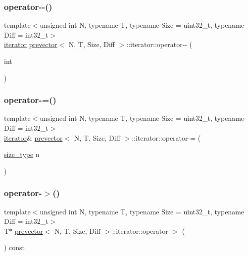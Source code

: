 \subsubsection{\texorpdfstring{operator-\/-\/()}{operator--()}\hspace{0.1cm}{\footnotesize\ttfamily [2/2]}}
{\footnotesize\ttfamily template$<$unsigned int N, typename T, typename Size = uint32\+\_\+t, typename Diff = int32\+\_\+t$>$ \\
\mbox{\hyperlink{classprevector_1_1iterator}{iterator}} \mbox{\hyperlink{classprevector}{prevector}}$<$ N, T, Size, Diff $>$\+::iterator\+::operator-\/-\/ (\begin{DoxyParamCaption}\item[{int}]{ }\end{DoxyParamCaption})\hspace{0.3cm}{\ttfamily [inline]}}

\mbox{\label{classprevector_1_1iterator_a979c36f0f892be45415f70ca65f325b4}} 
\subsubsection{\texorpdfstring{operator-\/=()}{operator-=()}}
{\footnotesize\ttfamily template$<$unsigned int N, typename T, typename Size = uint32\+\_\+t, typename Diff = int32\+\_\+t$>$ \\
\mbox{\hyperlink{classprevector_1_1iterator}{iterator}}\& \mbox{\hyperlink{classprevector}{prevector}}$<$ N, T, Size, Diff $>$\+::iterator\+::operator-\/= (\begin{DoxyParamCaption}\item[{\mbox{\hyperlink{classprevector_a7e0da95e6d1c878f6eeb572f4fc12524}{size\+\_\+type}}}]{n }\end{DoxyParamCaption})\hspace{0.3cm}{\ttfamily [inline]}}

\mbox{\label{classprevector_1_1iterator_a2d71176663fdf1736d59419d8016b652}} 
\subsubsection{\texorpdfstring{operator-\/$>$()}{operator->()}}
{\footnotesize\ttfamily template$<$unsigned int N, typename T, typename Size = uint32\+\_\+t, typename Diff = int32\+\_\+t$>$ \\
T$\ast$ \mbox{\hyperlink{classprevector}{prevector}}$<$ N, T, Size, Diff $>$\+::iterator\+::operator-\/$>$ (\begin{DoxyParamCaption}{ }\end{DoxyParamCaption}) const\hspace{0.3cm}{\ttfamily [inline]}}

